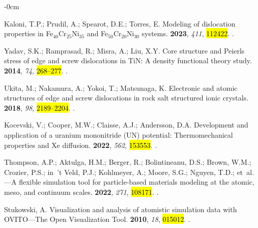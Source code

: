 \documentclass[applsci,article,accept,pdftex,moreauthors]{Definitions/mdpi}
\newcommand{\?}{\stackrel{?}{=}}
\begin{document}
\begin{adjustwidth}{-\extralength}{0cm}
\begin{thebibliography}{999}
Kaloni, T.P.; Prudil, A.; Spearot, D.E.; Torres, E.
\newblock Modeling of dislocation properties in {Fe$_{40}$Cr$_{25}$Ni$_{35}$}
  and {Fe$_{50}$Cr$_{20}$Ni$_{30}$} systems.
 {\bf 2023}, {\em 411}, \hl{112422}.
.

Yadav, S.K.; Ramprasad, R.; Misra, A.; Liu, X.Y.
\newblock Core structure and {Peierls} stress of edge and screw dislocations in
  {TiN}: A density functional theory study.
 {\bf 2014}, {\em 74}, \hl{268--277}.
.

Ukita, M.; Nakamura, A.; Yokoi, T.; Matsunaga, K.
\newblock Electronic and atomic structures of edge and screw dislocations in
  rock salt structured ionic crystals.
 {\bf 2018}, {\em 98}, \hl{2189--2204}.
.

Kocevski, V.; Cooper, M.W.; Claisse, A.J.; Andersson, D.A.
\newblock Development and application of a uranium mononitride ({UN})
  potential: Thermomechanical properties and {Xe} diffusion.
 {\bf 2022}, {\em 562}, \hl{153553}.
.

Thompson, A.P.; Aktulga, H.M.; Berger, R.; Bolintineanu, D.S.; Brown, W.M.;
  Crozier, P.S.; in~'t Veld, P.J.; Kohlmeyer, A.; Moore, S.G.; Nguyen, T.D.;
  et~al.
---A flexible simulation tool for particle-based materials
  modeling at the atomic, meso, and continuum scales.
 {\bf 2022}, {\em 271}, \hl{108171}.
.

Stukowski, A.
\newblock Visualization and analysis of atomistic simulation data with
  {OVITO}---The Open Visualization Tool.
  {\bf 2010}, {\em 18}, \hl{015012}.
.


\end{thebibliography}
\end{adjustwidth}
\end{document}
